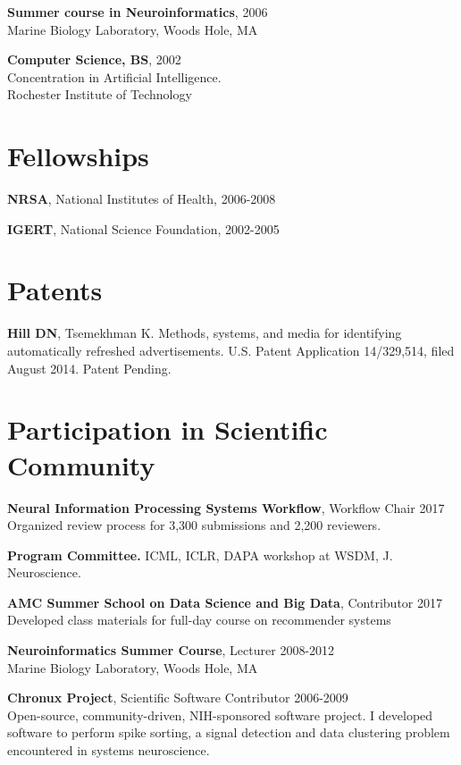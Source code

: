 \documentclass[line,11pt]{res}
\begin{document}
\begin{resume}
 	\textbf{Summer course in Neuroinformatics}, 2006 \\
    Marine Biology Laboratory, Woods Hole, MA 
    
 	\textbf{Computer Science, BS}, 2002 \\
    Concentration in Artificial Intelligence. \\
    Rochester Institute of Technology
    
\section{Fellowships}
\vspace{0.1in} 
 
 	\textbf{NRSA}, National Institutes of Health, 2006-2008
    
    \textbf{IGERT}, National Science Foundation, 2002-2005

\section{Patents}
\vspace{0.1in}
\textbf{Hill DN}, Tsemekhman K. Methods, systems, and media for identifying automatically refreshed advertisements. U.S. Patent Application 14/329,514, filed August 2014. Patent Pending.

\section{Participation in Scientific Community}
\vspace{0.1in} 

	\textbf{Neural Information Processing Systems Workflow}, Workflow Chair 2017 \\
    	Organized review process for 3,300 submissions and 2,200 reviewers.
    
  \textbf{Program Committee.} ICML, ICLR, DAPA workshop at WSDM, J. Neuroscience.

	\textbf{AMC Summer School on Data Science and Big Data}, Contributor 2017 \\
         Developed class materials for full-day course on recommender systems
         
	\textbf{Neuroinformatics Summer Course}, Lecturer 2008-2012 \\
    Marine Biology Laboratory, Woods Hole, MA
    
    	\textbf{Chronux Project}, Scientific Software Contributor 2006-2009 \\
    	Open-source, community-driven, NIH-sponsored software project. I developed software to perform spike sorting, a signal detection and data clustering problem encountered in systems neuroscience. 
    

\end{resume}
\end{document}
